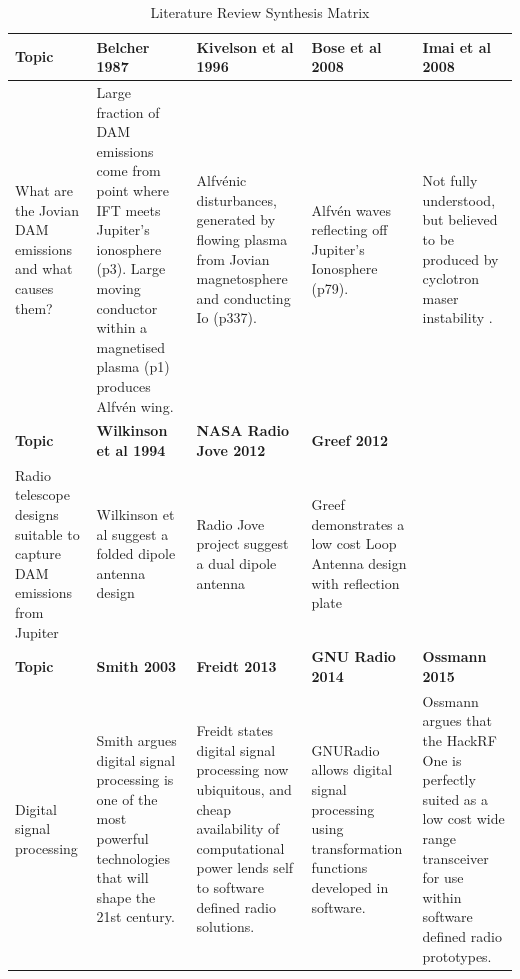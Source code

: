 \documentclass[runningheads,a4paper]{llncs}
\begin{document}
%
\begin{table}
  \centering
  \begin{tabular}{ | p{2.5cm} || p{2.5cm} | p{2.5cm} | p{2.5cm} | p{2.5cm} |}
    \hline
    \textbf{Topic} & \textbf{Belcher 1987} & \textbf{Kivelson et al 1996} & \textbf{Bose et al 2008} & \textbf{Imai et al 2008} \\ \hline \hline
    What are the Jovian DAM emissions and what causes them? & Large fraction of DAM emissions come from point where IFT meets Jupiter's ionosphere (p3). Large moving conductor within a magnetised plasma (p1) produces Alfv\'en wing. & Alfv\'enic disturbances, generated by flowing plasma from Jovian magnetosphere and conducting Io (p337). & Alfv\'en waves reflecting off Jupiter's Ionosphere (p79). & Not fully understood, but believed to be produced by cyclotron maser instability \citep{imai-08}. \\ \hline \hline

    \textbf{Topic} & \textbf{Wilkinson et al 1994} & \textbf{NASA Radio Jove 2012} & \textbf{Greef 2012} &  \\ \hline \hline

    Radio telescope designs suitable to capture DAM emissions from Jupiter & Wilkinson et al suggest a folded dipole antenna design & Radio Jove project suggest a dual dipole antenna & Greef demonstrates a low cost Loop Antenna design with reflection plate & \\ \hline \hline
    
    \textbf{Topic} & \textbf{Smith 2003} & \textbf{Freidt 2013} & \textbf{GNU Radio 2014} & \textbf{Ossmann 2015} \\ \hline \hline    
    
    Digital signal processing & Smith argues digital signal processing is one of the most powerful technologies that will shape the 21st century. & Freidt states digital signal processing now ubiquitous, and cheap availability of computational power lends self to software defined radio solutions. & GNURadio allows digital signal processing using transformation functions developed in software. & Ossmann argues that the HackRF One is perfectly suited as a low cost wide range transceiver for use within software defined radio prototypes. \\
    \hline
  \end{tabular}
  \caption{Literature Review Synthesis Matrix}
  \label{tab:literature_review_synthesis_matrix}
\end{table}
%
\end{document}
